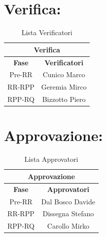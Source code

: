 \newpage
\section*{\LARGE Verifica:}
\begin{table}[!h]
	\begin{center}
		\begin{tabular}
			{|c|c|}
			\hline
			\multicolumn{2}{|c|}{ \textbf{Verifica}} \\
			\hline
			\textbf{Fase} & \textbf{Verificatori} \\
			\hline
			\multirow{1}{*}{Pre-RR}  &  Cunico Marco\\
			\hline
			\multirow{1}{*}{RR-RPP} & Geremia Mirco\\
									
			\hline
			\multirow{1}{*}{RPP-RQ} & Bizzotto Piero\\
			\hline
		\end{tabular}
		\caption{Lista Verificatori} %
		\label{tabverifica}
	\end{center}
\end{table}

\section*{\LARGE Approvazione:}
\begin{table}[!h]
	\begin{center}
		\begin{tabular}
			{|c|c|}
			\hline
			\multicolumn{2}{|c|}{ \textbf{Approvazione} } \\
			\hline
			\textbf{Fase} & \textbf{Approvatori} \\
			\hline
			\multirow{1}{*}{Pre-RR}  &  Dal Bosco Davide\\
			\hline
			\multirow{1}{*}{RR-RPP} & Dissegna Stefano\\
									
			\hline
			\multirow{1}{*}{RPP-RQ} & Carollo Mirko\\
			\hline
		\end{tabular}
		\caption{Lista Approvatori} %
		\label{tabapprovazione}
	\end{center}
\end{table}

